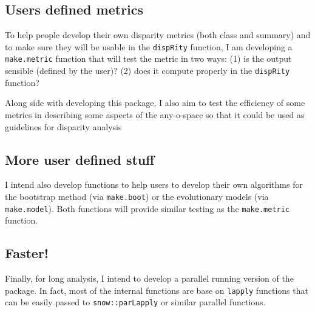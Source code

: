 \documentclass{article}\usepackage[]{graphicx}\usepackage[]{color}
\newcommand{\dispRity}{\texttt{dispRity} }
\begin{document}
\subsection{Users defined metrics}
To help people develop their own disparity metrics (both class and summary) and to make sure they will be usable in the \dispRity function, I am developing a \texttt{make.metric} function that will test the metric in two ways:
(1) is the output sensible (defined by the user)?
(2) does it compute properly in the \dispRity function?

Along side with developing this package, I also aim to test the efficiency of some metrics in describing some aspects of the any-o-space so that it could be used as guidelines for disparity analysis

\subsection{More user defined stuff}
I intend also develop functions to help users to develop their own algorithms for the bootstrap method (via \texttt{make.boot}) or the evolutionary models (via \texttt{make.model}).
Both functions will provide similar testing as the \texttt{make.metric} function.

\subsection{Faster!}
Finally, for long analysis, I intend to develop a parallel running version of the package.
In fact, most of the internal functions are base on \texttt{lapply} functions that can be easily passed to \texttt{snow::parLapply} or similar parallel functions.



\end{document}
